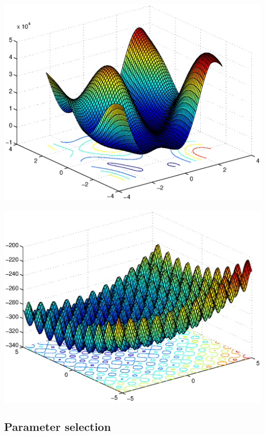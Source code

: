 \documentclass{csfourzero}
\newenvironment{Figure}
  {\par\medskip\noindent\minipage{\linewidth}}
  {\endminipage\par\medskip}
\begin{document}
\begin{multicols}{2}
\begin{Figure}
  \centering
  \includegraphics[width=\linewidth]{../functions/schwefel.eps}
\end{Figure}

\begin{Figure}
  \centering
  \includegraphics[width=\linewidth]{../functions/rastrigin_shifted.eps}
\end{Figure}

\end{multicols}



\subsection{Parameter selection}
\end{document}

